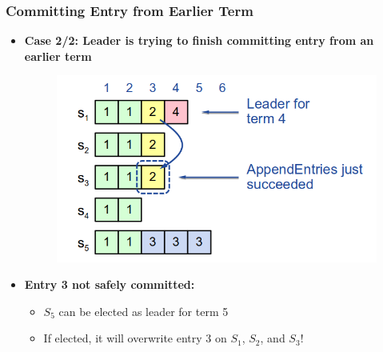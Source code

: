 \begin{frame}
    \frametitle{Committing Entry from Earlier Term}
    \begin{itemize}
        \item \textbf{Case 2/2: Leader is trying to finish committing entry from an earlier term}

        \begin{figure}
            \centering
            \includegraphics[scale=0.3]{./figures/raft-commite-entry2.png}
        \end{figure}

        \item \textbf{Entry 3 not safely committed:}
            \begin{itemize}
                \item $S_5$ can be elected as leader for term 5
                \item If elected, it will overwrite entry 3 on $S_1$, $S_2$, and $S_3$!
            \end{itemize}
    \end{itemize}
\end{frame}

